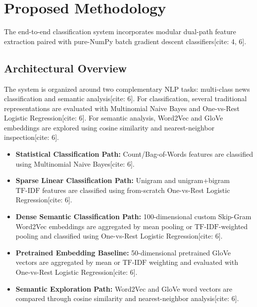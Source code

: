 \documentclass[11pt,a4paper]{article}
\begin{document}
	\section{Proposed Methodology}
	\label{sec:methodology}
	
	The end-to-end classification system incorporates modular dual-path feature extraction paired with pure-NumPy batch gradient descent classifiers[cite: 4, 6].
	
	\subsection{Architectural Overview}
	The system is organized around two complementary NLP tasks: multi-class news classification and semantic analysis[cite: 6]. For classification, several traditional representations are evaluated with Multinomial Naive Bayes and One-vs-Rest Logistic Regression[cite: 6]. For semantic analysis, Word2Vec and GloVe embeddings are explored using cosine similarity and nearest-neighbor inspection[cite: 6].
	
	\begin{itemize}[leftmargin=1.5em, itemsep=0.2em]
		\item \textbf{Statistical Classification Path:} Count/Bag-of-Words features are classified using Multinomial Naive Bayes[cite: 6].
		\item \textbf{Sparse Linear Classification Path:} Unigram and unigram+bigram $\text{TF-IDF}$ features are classified using from-scratch One-vs-Rest Logistic Regression[cite: 6].
		\item \textbf{Dense Semantic Classification Path:} 100-dimensional custom Skip-Gram Word2Vec embeddings are aggregated by mean pooling or $\text{TF-IDF}$-weighted pooling and classified using One-vs-Rest Logistic Regression[cite: 6].
		\item \textbf{Pretrained Embedding Baseline:} 50-dimensional pretrained GloVe vectors are aggregated by mean or $\text{TF-IDF}$ weighting and evaluated with One-vs-Rest Logistic Regression[cite: 6].
		\item \textbf{Semantic Exploration Path:} Word2Vec and GloVe word vectors are compared through cosine similarity and nearest-neighbor analysis[cite: 6].
	\end{itemize}
	
\end{document}
